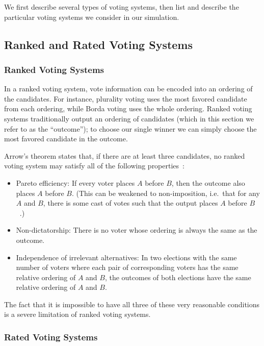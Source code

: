 \documentclass[11pt]{article}
\begin{document}
    We first describe several types of voting systems,
    then list and describe the particular voting systems we consider in our simulation.

    \subsection{Ranked and Rated Voting Systems}\label{subsec:ranked-and-rated-voting-systems}

    \subsubsection{Ranked Voting Systems}

    In a ranked voting system, vote information can be encoded into an ordering of the candidates.
    For instance, plurality voting uses the most favored candidate from each ordering,
    while Borda voting uses the whole ordering.
    Ranked voting systems traditionally output an ordering of candidates
    (which in this section we refer to as the ``outcome'');
    to choose our single winner we can simply choose the most favored candidate in the outcome.

    Arrow's theorem states that, if there are at least three candidates,
    no ranked voting system may satisfy all of the following properties~\cite{Arrow}:

    \begin{itemize}
        \item Pareto efficiency:
        If every voter places $A$ before $B$, then the outcome also places $A$ before $B$.
        (This can be weakened to non-imposition,
        i.e.\ that for any $A$ and $B$, there is some cast of votes such that
        the output places $A$ before $B$~\cite{Wilson}.)
        \item Non-dictatorship:
        There is no voter whose ordering is always the same as the outcome.
        \item Independence of irrelevant alternatives:
        In two elections with the same number of voters where each pair of
        corresponding voters has the same relative ordering of $A$ and $B$,
        the outcomes of both elections have the same relative ordering of $A$ and $B$.
    \end{itemize}

    The fact that it is impossible to have all three of these very reasonable conditions is a
    severe limitation of ranked voting systems.

    \subsubsection{Rated Voting Systems}
\end{document}
